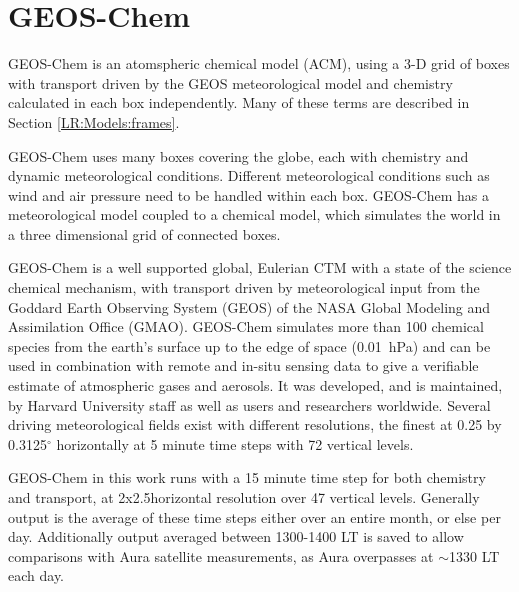 \section{GEOS-Chem}
  \label{Model:GC}
  GEOS-Chem is an atomspheric chemical model (ACM), using a 3-D grid of boxes with transport driven by the GEOS meteorological model and chemistry calculated in each box independently. 
  Many of these terms are described in Section \ref{LR:Models:frames}.
  
  GEOS-Chem uses many boxes covering the globe, each with chemistry and dynamic meteorological conditions.
  Different meteorological conditions such as wind and air pressure need to be handled within each box.      
  GEOS-Chem has a meteorological model coupled to a chemical model, which simulates the world in a three dimensional grid of connected boxes.
  
  GEOS-Chem is a well supported global, Eulerian CTM with a state of the science chemical mechanism, with transport driven by meteorological input from the Goddard Earth Observing System (GEOS) of the NASA Global Modeling and Assimilation Office (GMAO).
  GEOS-Chem simulates more than 100 chemical species from the earth's surface up to the edge of space (0.01~hPa) and can be used in combination with remote and in-situ sensing data to give a verifiable estimate of atmospheric gases and aerosols.
  It was developed, and is maintained, by Harvard University staff as well as users and researchers worldwide.
  Several driving meteorological fields exist with different resolutions, the finest at 0.25 by 0.3125$^\circ$ horizontally at 5 minute time steps with 72 vertical levels.
  
  GEOS-Chem in this work runs with a 15 minute time step for both chemistry and transport, at 2x2.5\degr horizontal resolution over 47 vertical levels.
  Generally output is the average of these time steps either over an entire month, or else per day.
  Additionally output averaged between 1300-1400 LT is saved to allow comparisons with Aura satellite measurements, as Aura overpasses at $\sim$1330 LT each day.
  
